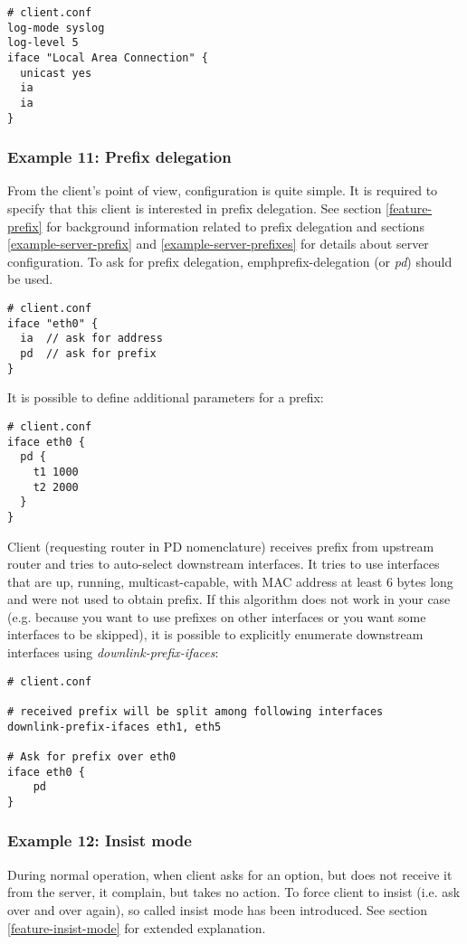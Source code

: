 \begin{lstlisting}
# client.conf
log-mode syslog
log-level 5
iface "Local Area Connection" {
  unicast yes
  ia
  ia
}
\end{lstlisting}

\subsubsection{Example 11: Prefix delegation}
\label{example-client-prefix}
From the client's point of view, configuration is quite simple. It is
required to specify that this client is interested in prefix
delegation. See section \ref{feature-prefix} for background
information related to prefix delegation and sections
\ref{example-server-prefix} and \ref{example-server-prefixes} for
details about server configuration. To ask for prefix delegation,
emph{prefix-delegation} (or \emph{pd}) should be used.

\begin{lstlisting}
# client.conf
iface "eth0" {
  ia  // ask for address
  pd  // ask for prefix
}
\end{lstlisting}

It is possible to define additional parameters for a prefix:

\begin{lstlisting}
# client.conf
iface eth0 {
  pd {
    t1 1000
    t2 2000
  }
}
\end{lstlisting}

Client (requesting router in PD nomenclature) receives prefix from
upstream router and tries to auto-select downstream interfaces. It
tries to use interfaces that are up, running, multicast-capable, with
MAC address at least 6 bytes long and were not used to obtain
prefix. If this algorithm does not work in your case (e.g. because you
want to use prefixes on other interfaces or you want some interfaces
to be skipped), it is possible to explicitly enumerate downstream
interfaces using \emph{downlink-prefix-ifaces}:

\begin{lstlisting}
# client.conf

# received prefix will be split among following interfaces
downlink-prefix-ifaces eth1, eth5

# Ask for prefix over eth0
iface eth0 {
    pd 
}
\end{lstlisting}


\subsubsection{Example 12: Insist mode}
\label{example-client-insistmode}
During normal operation, when client asks for an option, but does not
receive it from the server, it complain, but takes no action. To force
client to insist (i.e. ask over and over again), so called insist mode
has been introduced. See section \ref{feature-insist-mode} for
extended explanation.

